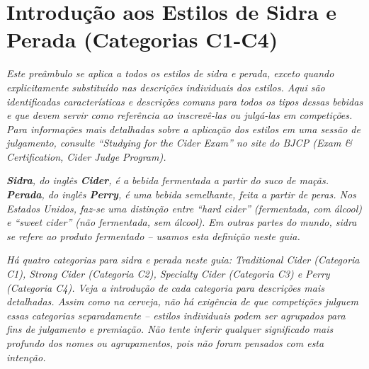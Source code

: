 \section*{Introdução aos Estilos de Sidra e Perada (Categorias C1-C4)}
\textit{Este preâmbulo se aplica a todos os estilos de sidra e perada, exceto quando explicitamente substituído nas descrições individuais dos estilos. Aqui são identificadas características e descrições comuns para todos os tipos dessas bebidas e que devem servir como referência ao inscrevê-las ou julgá-las em competições. Para informações mais detalhadas sobre a aplicação dos estilos em uma sessão de julgamento, consulte “Studying for the Cider Exam” no site do BJCP (Exam \& Certification, Cider Judge Program).}

\textit{\textbf{Sidra}, do inglês \textbf{Cider}, é a bebida fermentada a partir do suco de maçãs. \textbf{Perada}, do inglês \textbf{Perry}, é uma bebida semelhante, feita a partir de peras. Nos Estados Unidos, faz-se uma distinção entre “hard cider” (fermentada, com álcool) e “sweet cider” (não fermentada, sem álcool). Em outras partes do mundo, sidra se refere ao produto fermentado – usamos esta definição neste guia.}

\textit{Há quatro categorias para sidra e perada neste guia: Traditional Cider (Categoria C1), Strong Cider (Categoria C2), Specialty Cider (Categoria C3) e Perry (Categoria C4). Veja a introdução de cada categoria para descrições mais detalhadas. Assim como na cerveja, não há exigência de que competições julguem essas categorias separadamente – estilos individuais podem ser agrupados para fins de julgamento e premiação. Não tente inferir qualquer significado mais profundo dos nomes ou agrupamentos, pois não foram pensados com esta intenção.}
